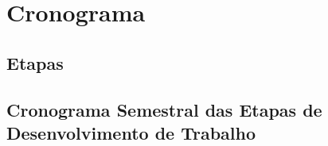 \chapter{Cronograma} \label{chapter:cronograma}


\section{Etapas}

\newpage

\section{Cronograma Semestral das Etapas de Desenvolvimento de Trabalho}


